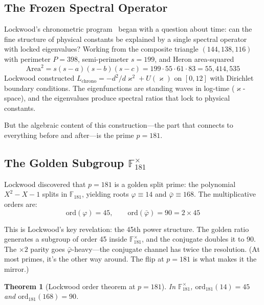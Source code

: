 \documentclass[12pt,oneside]{article}
\theoremstyle{principia}
\newtheorem{theorem}{Theorem}[section]
\theoremstyle{definition}
\theoremstyle{remark}
\providecommand{\FF}{\mathbb{F}}
\providecommand{\vp}{\varphi}
\providecommand{\vpbar}{\bar{\varphi}}
\begin{document}
\subsection{The Frozen Spectral Operator}

Lockwood's chronometric program~\cite{lockwood_chrono3,lockwood_chrono4} began with a question about time: can the fine structure of physical constants be explained by a single spectral operator with locked eigenvalues? Working from the composite triangle $(144, 138, 116)$ with perimeter $P = 398$, semi-perimeter $s = 199$, and Heron area-squared
\[
\mathrm{Area}^2 = s(s-a)(s-b)(s-c) = 199 \cdot 55 \cdot 61 \cdot 83 = 55{,}414{,}535
\]
Lockwood constructed $L_{\mathrm{chrono}} = -d^2/d\varkappa^2 + U(\varkappa)$ on $[0, 12]$ with Dirichlet boundary conditions. The eigenfunctions are standing waves in log-time ($\varkappa$-space), and the eigenvalues produce spectral ratios that lock to physical constants.

But the algebraic content of this construction---the part that connects to everything before and after---is the prime $p = 181$.

\subsection{The Golden Subgroup $\FF_{181}^\times$}

Lockwood discovered that $p = 181$ is a golden split prime: the polynomial $X^2 - X - 1$ splits in $\FF_{181}$, yielding roots $\vp \equiv 14$ and $\vpbar \equiv 168$. The multiplicative orders are:
\begin{equation}\label{eq:lockwood_orders}
\mathrm{ord}(\vp) = 45, \qquad \mathrm{ord}(\vpbar) = 90 = 2 \times 45
\end{equation}

This is Lockwood's key revelation: the 45th power structure. The golden ratio generates a subgroup of order 45 inside $\FF_{181}^\times$, and the conjugate doubles it to 90. The $\times 2$ parity goes $\vpbar$-heavy---the conjugate channel has twice the resolution. (At most primes, it's the other way around. The flip at $p = 181$ is what makes it the mirror.)

\begin{theorem}[Lockwood order theorem at $p = 181$]\label{thm:lockwood_mirror}
In $\FF_{181}^\times$, $\mathrm{ord}_{181}(14) = 45$ and $\mathrm{ord}_{181}(168) = 90$.
\end{theorem}
\end{document}
